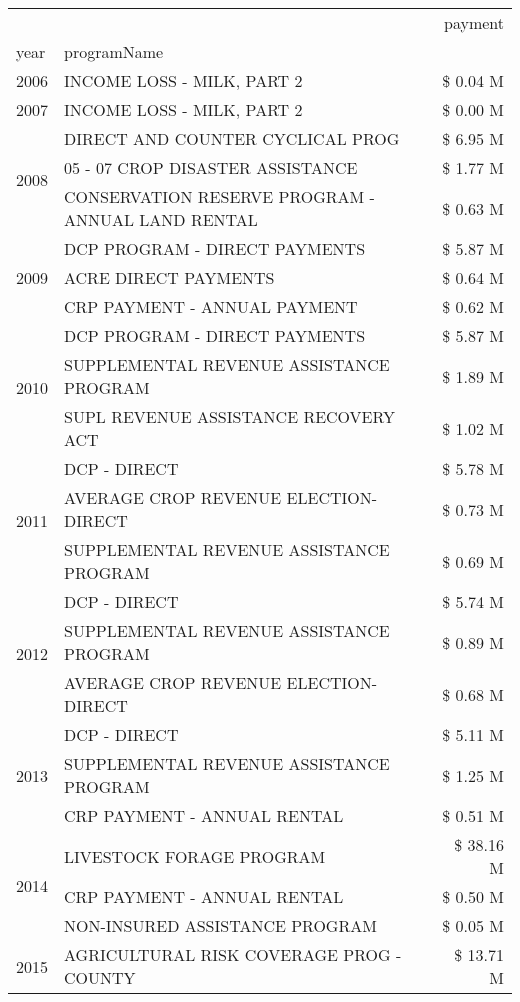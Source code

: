 \begin{tabular}{llr}
\toprule
 &  & payment \\
year & programName &  \\
\midrule
2006 & INCOME LOSS - MILK, PART 2 & \$ 0.04 M \\
\cline{1-3}
2007 & INCOME LOSS - MILK, PART 2 & \$ 0.00 M \\
\cline{1-3}
\multirow[t]{3}{*}{2008} & DIRECT AND COUNTER CYCLICAL PROG & \$ 6.95 M \\
 & 05 - 07 CROP DISASTER ASSISTANCE & \$ 1.77 M \\
 & CONSERVATION RESERVE PROGRAM - ANNUAL LAND RENTAL & \$ 0.63 M \\
\cline{1-3}
\multirow[t]{3}{*}{2009} & DCP PROGRAM - DIRECT PAYMENTS & \$ 5.87 M \\
 & ACRE DIRECT PAYMENTS & \$ 0.64 M \\
 & CRP PAYMENT - ANNUAL PAYMENT & \$ 0.62 M \\
\cline{1-3}
\multirow[t]{3}{*}{2010} & DCP PROGRAM - DIRECT PAYMENTS & \$ 5.87 M \\
 & SUPPLEMENTAL REVENUE ASSISTANCE PROGRAM & \$ 1.89 M \\
 & SUPL REVENUE ASSISTANCE RECOVERY ACT & \$ 1.02 M \\
\cline{1-3}
\multirow[t]{3}{*}{2011} & DCP - DIRECT & \$ 5.78 M \\
 & AVERAGE CROP REVENUE ELECTION-DIRECT & \$ 0.73 M \\
 & SUPPLEMENTAL REVENUE ASSISTANCE PROGRAM & \$ 0.69 M \\
\cline{1-3}
\multirow[t]{3}{*}{2012} & DCP - DIRECT & \$ 5.74 M \\
 & SUPPLEMENTAL REVENUE ASSISTANCE PROGRAM & \$ 0.89 M \\
 & AVERAGE CROP REVENUE ELECTION-DIRECT & \$ 0.68 M \\
\cline{1-3}
\multirow[t]{3}{*}{2013} & DCP - DIRECT & \$ 5.11 M \\
 & SUPPLEMENTAL REVENUE ASSISTANCE PROGRAM & \$ 1.25 M \\
 & CRP PAYMENT - ANNUAL RENTAL & \$ 0.51 M \\
\cline{1-3}
\multirow[t]{3}{*}{2014} & LIVESTOCK FORAGE PROGRAM & \$ 38.16 M \\
 & CRP PAYMENT - ANNUAL RENTAL & \$ 0.50 M \\
 & NON-INSURED ASSISTANCE PROGRAM & \$ 0.05 M \\
\cline{1-3}
\multirow[t]{3}{*}{2015} & AGRICULTURAL RISK COVERAGE PROG - COUNTY & \$ 13.71 M \\

\end{tabular}
